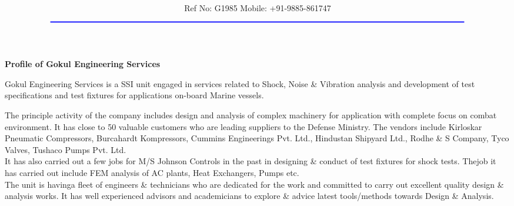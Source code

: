 \documentclass[12pt,A4]{article}
\title{\vspace*{-1.5cm} \centerline{ {\Huge{ \bf \hspace{0cm}{\color{blue} Gokul Engineering Services}}\vspace*{-0.75cm}}}}
\author{\centerline {\color{blue}{43-9-156/1, R S Mandir, Dondaparty Jn, Visakhapatnam - 16}}\\ \\
 \footnotesize {\color{blue}Ref No: G1985  \hspace*{5cm}   Mobile: +91-9885-861747}\\
${\color{blue}\rule{7.0in}{0.5mm}}$}
\date{}
\begin{document}
\maketitle
\thispagestyle{empty}
\vspace*{20pt}


{\begin{center}{\bf  \large Profile of Gokul Engineering Services}\end{center}}

\vspace*{20pt}


 Gokul Engineering Services is a SSI unit engaged in services related to Shock, Noise \& Vibration analysis and development of test specifications and test fixtures for applications on-board Marine vessels.

\indent  The principle  activity of the company includes design and analysis of complex machinery for application with complete focus on combat environment. It has close to 50 valuable customers who are leading suppliers to the Defense Ministry. The vendors include Kirloskar Pneumatic Compressors, Burcahardt Kompressors, Cummins Engineerings Pvt. Ltd., Hindustan Shipyard Ltd., Rodhe \& S Company, Tyco Valves, Tushaco Pumps Pvt. Ltd. \\
 
\noindent It has also carried out a few jobs for M/S Johnson Controls in the past in designing \& conduct of test fixtures for shock tests. Thejob it has carried out include FEM analysis of AC plants, Heat Exchangers, Pumps etc.\\

\noindent The unit is havinga fleet of engineers \& technicians who are dedicated for the work and committed to carry out excellent quality design \& analysis works. It has well experienced advisors and academicians to explore \& advice latest tools/methods towards Design \& Analysis. 
\end{document}
